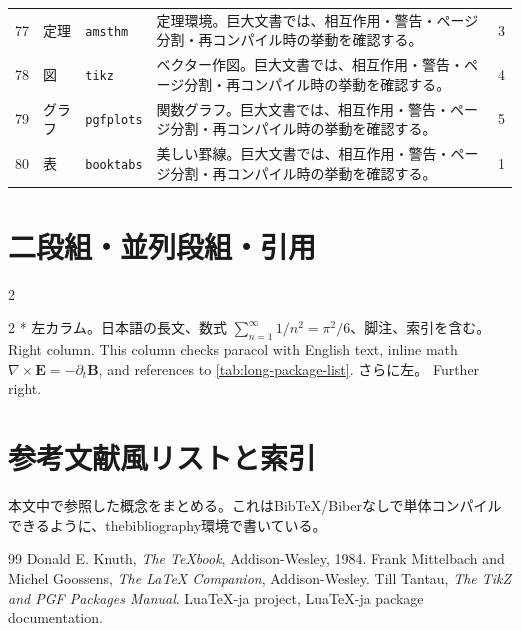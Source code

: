 \documentclass[12pt,a4paper,openany]{ltjsbook}
\theoremstyle{definition}
\theoremstyle{plain}
\theoremstyle{remark}
\newcommand{\vect}[1]{\bm{#1}}
\begin{document}
\begin{landscape}
\begin{longtable}{llp{55mm}p{80mm}r}
77 & 定理 & \texttt{amsthm} & 定理環境。巨大文書では、相互作用・警告・ページ分割・再コンパイル時の挙動を確認する。 & 3\\
78 & 図 & \texttt{tikz} & ベクター作図。巨大文書では、相互作用・警告・ページ分割・再コンパイル時の挙動を確認する。 & 4\\
79 & グラフ & \texttt{pgfplots} & 関数グラフ。巨大文書では、相互作用・警告・ページ分割・再コンパイル時の挙動を確認する。 & 5\\
80 & 表 & \texttt{booktabs} & 美しい罫線。巨大文書では、相互作用・警告・ページ分割・再コンパイル時の挙動を確認する。 & 1\\
\bottomrule
\end{longtable}
\end{landscape}

\chapter{二段組・並列段組・引用}
\begin{multicols}{2}
\blindtext[6]
\end{multicols}

\begin{paracol}{2}
\switchcolumn[0]*
左カラム。日本語の長文、数式 $\sum_{n=1}^{\infty}1/n^2=\pi^2/6$、脚注、索引を含む。
\switchcolumn
Right column. This column checks paracol with English text, inline math $\nabla\times\vect{E}=-\partial_t\vect{B}$, and references to \cref{tab:long-package-list}.
\switchcolumn[0]
さらに左。\blindtext[1]
\switchcolumn
Further right. \blindtext[1]
\end{paracol}

\chapter{参考文献風リストと索引}
本文中で参照した概念をまとめる。これはBibTeX/Biberなしで単体コンパイルできるように、thebibliography環境で書いている。
\begin{thebibliography}{99}
 Donald E. Knuth, \textit{The TeXbook}, Addison-Wesley, 1984.
 Frank Mittelbach and Michel Goossens, \textit{The LaTeX Companion}, Addison-Wesley.
 Till Tantau, \textit{The TikZ and PGF Packages Manual}.
 LuaTeX-ja project, LuaTeX-ja package documentation.
\end{thebibliography}

\backmatter
\printindex
\end{document}
